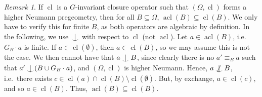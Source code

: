 \documentclass{article}
\theoremstyle{remark}
\newtheorem{remark}[theorem]{Remark}
\theoremstyle{definition}
\DeclareMathOperator{\cl}{cl}
\DeclareMathOperator{\acl}{acl}
\def\Ind#1#2{#1\setbox0=\hbox{$#1x$}\kern\wd0\hbox to 0pt{\hss$#1\mid$\hss}
	\lower.9\ht0\hbox to 0pt{\hss$#1\smile$\hss}\kern\wd0}
\def\ind{\mathop{\mathpalette\Ind{}}}
\def\Notind#1#2{#1\setbox0=\hbox{$#1x$}\kern\wd0\hbox to 0pt{\mathchardef
		\nn="3236\hss$#1\nn$\kern1.4\wd0\hss}\hbox to
	0pt{\hss$#1\mid$\hss}\lower.9\ht0
	\hbox to 0pt{\hss$#1\smile$\hss}\kern\wd0}
\def\nind{\mathop{\mathpalette\Notind{}}}
\begin{document}
{\begin{remark}\label{rem:minimalityOfacl}
    {If $\cl$ is a $G$-invariant closure operator such that $(\Omega, \cl)$ forms a higher Neumann pregeometry, then for all $B\subseteq \Omega$, $\acl(B)\subseteq\cl(B)$. We only have to verify this for finite $B$, as both operators are algebraic  by definition. In the following, we use $\ind$ with respect to $\cl$ (not $\acl$). Let $a\in\acl(B)$, i.e.~$G_B\cdot a$ is finite. {If $a\in\cl(\emptyset)$, then $a\in\cl(B)$, so we may assume this is not the case.} We then  cannot have that $a\ind B$, since %
     {clearly there} is no $a'\equiv_B a$ such that $a'\ind (B\cup G_B\cdot a)$, {and} $(\Omega,\cl)$ {is higher Neumann}. Hence, $a\nind B$, i.e.~there exists  $c\in\cl(a)\cap\cl(B)\setminus\cl(\emptyset)$. But, by exchange, $a\in\cl(c)$, and so $a\in\cl(B)$. Thus, $\acl(B)\subseteq\cl(B)$.}
\end{remark}

    







    



}
\end{document}
